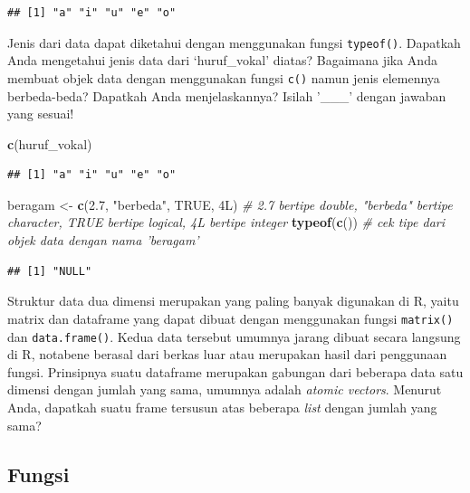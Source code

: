 \documentclass[]{article}
\newenvironment{Shaded}{\begin{snugshade}}{\end{snugshade}}
\newcommand{\CommentTok}[1]{\textcolor[rgb]{0.56,0.35,0.01}{\textit{#1}}}
\newcommand{\FloatTok}[1]{\textcolor[rgb]{0.00,0.00,0.81}{#1}}
\newcommand{\KeywordTok}[1]{\textcolor[rgb]{0.13,0.29,0.53}{\textbf{#1}}}
\newcommand{\NormalTok}[1]{#1}
\newcommand{\OtherTok}[1]{\textcolor[rgb]{0.56,0.35,0.01}{#1}}
\newcommand{\StringTok}[1]{\textcolor[rgb]{0.31,0.60,0.02}{#1}}
\begin{document}
\begin{verbatim}
## [1] "a" "i" "u" "e" "o"
\end{verbatim}

Jenis dari data dapat diketahui dengan menggunakan fungsi
\texttt{typeof()}. Dapatkah Anda mengetahui jenis data dari
`huruf\_vokal' diatas? Bagaimana jika Anda membuat objek data dengan
menggunakan fungsi \texttt{c()} namun jenis elemennya berbeda-beda?
Dapatkah Anda menjelaskannya? Isilah '\_\_\_' dengan jawaban yang
sesuai!

\begin{Shaded}
\begin{Highlighting}[]
\KeywordTok{c}\NormalTok{(huruf_vokal)}
\end{Highlighting}
\end{Shaded}

\begin{verbatim}
## [1] "a" "i" "u" "e" "o"
\end{verbatim}

\begin{Shaded}
\begin{Highlighting}[]
\NormalTok{beragam <-}\StringTok{ }\KeywordTok{c}\NormalTok{(}\FloatTok{2.7}\NormalTok{, }\StringTok{"berbeda"}\NormalTok{, }\OtherTok{TRUE}\NormalTok{, 4L) }\CommentTok{# 2.7 bertipe double, "berbeda" bertipe character, TRUE bertipe logical, 4L bertipe integer}
\KeywordTok{typeof}\NormalTok{(}\KeywordTok{c}\NormalTok{()) }\CommentTok{# cek tipe dari objek data dengan nama 'beragam'}
\end{Highlighting}
\end{Shaded}

\begin{verbatim}
## [1] "NULL"
\end{verbatim}

Struktur data dua dimensi merupakan yang paling banyak digunakan di R,
yaitu matrix dan dataframe yang dapat dibuat dengan menggunakan fungsi
\texttt{matrix()} dan \texttt{data.frame()}. Kedua data tersebut umumnya
jarang dibuat secara langsung di R, notabene berasal dari berkas luar
atau merupakan hasil dari penggunaan fungsi. Prinsipnya suatu dataframe
merupakan gabungan dari beberapa data satu dimensi dengan jumlah yang
sama, umumnya adalah \emph{atomic vectors}. Menurut Anda, dapatkah suatu
frame tersusun atas beberapa \emph{list} dengan jumlah yang sama?

\hypertarget{fungsi}{%
\subsection{Fungsi}\label{fungsi}}
\end{document}
